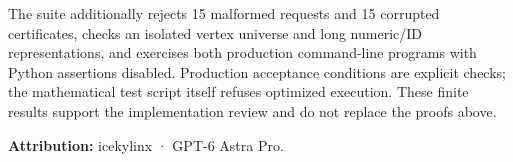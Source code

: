 The suite additionally rejects 15 malformed requests and 15 corrupted certificates, checks an isolated vertex universe and long numeric/ID representations, and exercises both production command-line programs with Python assertions disabled. Production acceptance conditions are explicit checks; the mathematical test script itself refuses optimized execution. These finite results support the implementation review and do not replace the proofs above.

\textbf{Attribution:} icekylinx · GPT-6 Astra Pro.

